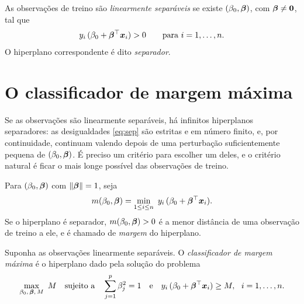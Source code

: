 \documentclass[11pt,a4paper]{article}
\begin{document}
\begin{definicao}
As observações de treino são \emph{linearmente separáveis} se existe
$(\beta_0,\bm{\beta})$, com $\bm{\beta}\ne\bm 0$, tal que
\begin{equation}\label{eq:sep}
  y_i\,(\beta_0+\bm{\beta}^\top\bm{x}_i)>0 \qquad\text{para } i=1,\dots,n.
\end{equation}
O hiperplano correspondente é dito \emph{separador}.
\end{definicao}

\section{O classificador de margem máxima}
Se as observações são linearmente separáveis, há infinitos hiperplanos separadores:
as desigualdades \eqref{eq:sep} são estritas e em número finito, e, por continuidade,
continuam valendo depois de uma perturbação suficientemente pequena de
$(\beta_0,\bm{\beta})$. É preciso um critério para escolher um deles, e o critério natural
é ficar o mais longe possível das observações de treino.

\begin{definicao}[Margem]
Para $(\beta_0,\bm{\beta})$ com $\left\lVert \bm{\beta} \right\rVert=1$, seja
\[
  m(\beta_0,\bbeta)=\min_{1\le i\le n}\ y_i\,(\beta_0+\bbeta^\top\x_i).
\]
Se o hiperplano é separador, $m(\beta_0,\bm{\beta})>0$ é a menor distância de uma
observação de treino a ele, e é chamado de \emph{margem} do hiperplano.
\end{definicao}

\begin{definicao}
Suponha as observações linearmente separáveis. O \emph{classificador de margem
máxima} é o hiperplano dado pela solução do problema
\begin{equation}\label{eq:mm}
  \max_{\beta_0,\,\bm{\beta},\,M}\ M
  \quad\text{sujeito a}\quad
  \sum_{j=1}^p\beta_j^2=1
  \quad\text{e}\quad
  y_i\,(\beta_0+\bm{\beta}^\top\bm{x}_i)\ge M,\ \ i=1,\dots,n.
\end{equation}
\end{definicao}
\end{document}
